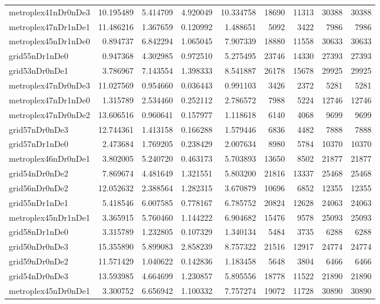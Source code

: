 \begin{longtable}{|l|r|r|r|r|r|r|r|r|}
metroplex41nDr0nDe3 & 10.195489 & 5.414709 & 4.920049 & 10.334758 & 18690 & 11313 & 30388 & 30388 \\
metroplex47nDr1nDe1 & 11.486216 & 1.367659 & 0.120992 & 1.488651 & 5092 & 3422 & 7986 & 7986 \\
metroplex45nDr1nDe0 & 0.894737 & 6.842294 & 1.065045 & 7.907339 & 18880 & 11558 & 30633 & 30633 \\
grid55nDr1nDe0 & 0.947368 & 4.302985 & 0.972510 & 5.275495 & 23746 & 14330 & 27393 & 27393 \\
grid53nDr0nDe1 & 3.786967 & 7.143554 & 1.398333 & 8.541887 & 26178 & 15678 & 29925 & 29925 \\
metroplex47nDr0nDe3 & 11.027569 & 0.954660 & 0.036443 & 0.991103 & 3426 & 2372 & 5281 & 5281 \\
metroplex47nDr1nDe0 & 1.315789 & 2.534460 & 0.252112 & 2.786572 & 7988 & 5224 & 12746 & 12746 \\
metroplex47nDr0nDe2 & 13.606516 & 0.960641 & 0.157977 & 1.118618 & 6140 & 4068 & 9699 & 9699 \\
grid57nDr0nDe3 & 12.744361 & 1.413158 & 0.166288 & 1.579446 & 6836 & 4482 & 7888 & 7888 \\
grid57nDr1nDe0 & 2.473684 & 1.769205 & 0.238429 & 2.007634 & 8980 & 5784 & 10370 & 10370 \\
metroplex46nDr0nDe1 & 3.802005 & 5.240720 & 0.463173 & 5.703893 & 13650 & 8502 & 21877 & 21877 \\
grid54nDr0nDe2 & 7.869674 & 4.481649 & 1.321551 & 5.803200 & 21816 & 13337 & 25468 & 25468 \\
grid56nDr0nDe2 & 12.052632 & 2.388564 & 1.282315 & 3.670879 & 10696 & 6852 & 12355 & 12355 \\
grid55nDr1nDe1 & 5.418546 & 6.007585 & 0.778167 & 6.785752 & 20824 & 12628 & 24063 & 24063 \\
metroplex45nDr1nDe1 & 3.365915 & 5.760460 & 1.144222 & 6.904682 & 15476 & 9578 & 25093 & 25093 \\
grid58nDr1nDe0 & 3.315789 & 1.232805 & 0.107329 & 1.340134 & 5484 & 3735 & 6288 & 6288 \\
grid50nDr0nDe3 & 15.355890 & 5.899083 & 2.858239 & 8.757322 & 21516 & 12917 & 24774 & 24774 \\
grid59nDr0nDe2 & 11.571429 & 1.040622 & 0.142836 & 1.183458 & 5648 & 3804 & 6466 & 6466 \\
grid54nDr0nDe3 & 13.593985 & 4.664699 & 1.230857 & 5.895556 & 18778 & 11522 & 21890 & 21890 \\
metroplex45nDr0nDe1 & 3.300752 & 6.656942 & 1.100332 & 7.757274 & 19072 & 11728 & 30890 & 30890 \\

\end{longtable}
